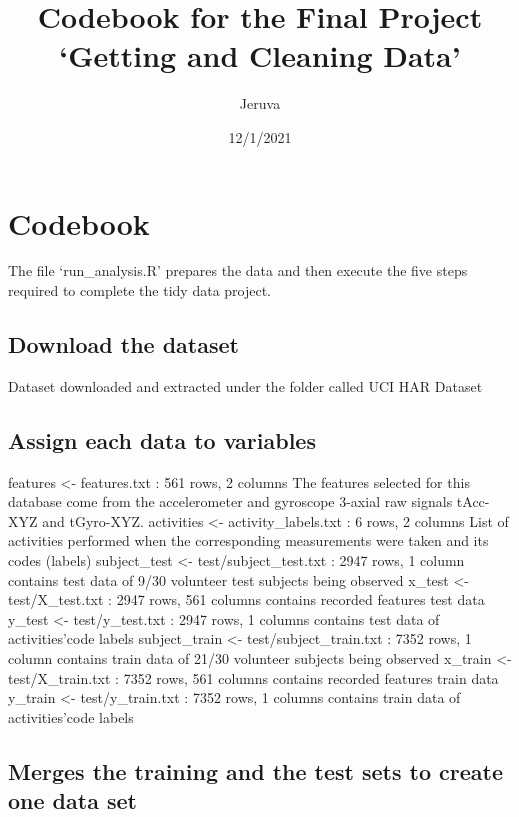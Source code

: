 \documentclass[
]{article}
\title{Codebook for the Final Project `Getting and Cleaning Data'}
\author{Jeruva}
\date{12/1/2021}
\begin{document}
\maketitle

\hypertarget{codebook}{%
\section{Codebook}\label{codebook}}

The file `run\_analysis.R' prepares the data and then execute the five
steps required to complete the tidy data project.

\hypertarget{download-the-dataset}{%
\subsection{Download the dataset}\label{download-the-dataset}}

Dataset downloaded and extracted under the folder called UCI HAR Dataset

\hypertarget{assign-each-data-to-variables}{%
\subsection{Assign each data to
variables}\label{assign-each-data-to-variables}}

features \textless- features.txt : 561 rows, 2 columns The features
selected for this database come from the accelerometer and gyroscope
3-axial raw signals tAcc-XYZ and tGyro-XYZ. activities \textless-
activity\_labels.txt : 6 rows, 2 columns List of activities performed
when the corresponding measurements were taken and its codes (labels)
subject\_test \textless- test/subject\_test.txt : 2947 rows, 1 column
contains test data of 9/30 volunteer test subjects being observed
x\_test \textless- test/X\_test.txt : 2947 rows, 561 columns contains
recorded features test data y\_test \textless- test/y\_test.txt : 2947
rows, 1 columns contains test data of activities'code labels
subject\_train \textless- test/subject\_train.txt : 7352 rows, 1 column
contains train data of 21/30 volunteer subjects being observed x\_train
\textless- test/X\_train.txt : 7352 rows, 561 columns contains recorded
features train data y\_train \textless- test/y\_train.txt : 7352 rows, 1
columns contains train data of activities'code labels

\hypertarget{merges-the-training-and-the-test-sets-to-create-one-data-set}{%
\subsection{Merges the training and the test sets to create one data
set}\label{merges-the-training-and-the-test-sets-to-create-one-data-set}}
\end{document}
